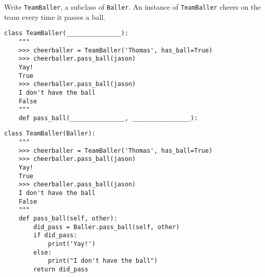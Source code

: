 \begin{blocksection}
\question Write \lstinline$TeamBaller$, a subclass of \lstinline$Baller$. An instance of \lstinline$TeamBaller$ cheers on the team every time it passes a ball.

\ifprintanswers\else
\begin{lstlisting}
class TeamBaller(_______________):
    """
    >>> cheerballer = TeamBaller('Thomas', has_ball=True)
    >>> cheerballer.pass_ball(jason)
    Yay!
    True
    >>> cheerballer.pass_ball(jason)
    I don't have the ball
    False
    """
    def pass_ball(_______________, ________________):
\end{lstlisting}
\fi

\begin{solution}[1in]
\begin{lstlisting}
class TeamBaller(Baller):
    """
    >>> cheerballer = TeamBaller('Thomas', has_ball=True)
    >>> cheerballer.pass_ball(jason)
    Yay!
    True
    >>> cheerballer.pass_ball(jason)
    I don't have the ball
    False
    """
    def pass_ball(self, other):
        did_pass = Baller.pass_ball(self, other)
        if did_pass:
            print('Yay!')
        else:
            print("I don't have the ball")
        return did_pass
\end{lstlisting}
\end{solution}
\end{blocksection}
